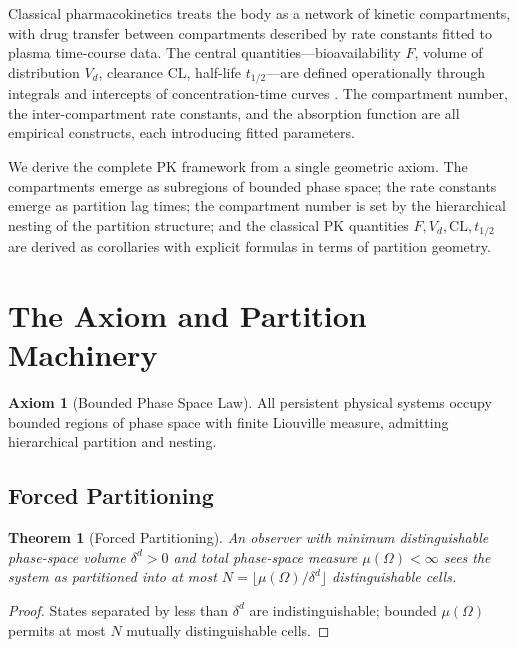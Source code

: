 \documentclass[twocolumn,10pt,a4paper]{article}
\newtheorem{theorem}{Theorem}[section]
\theoremstyle{definition}
\newtheorem{axiom}{Axiom}
\theoremstyle{remark}
\begin{document}
Classical pharmacokinetics \citep{rowland_tozer_2011,shargel_yu_2016,gibaldi_perrier_1982,goodman_gilman} treats the body as a network of kinetic compartments, with drug transfer between compartments described by rate constants fitted to plasma time-course data. The central quantities---bioavailability $F$, volume of distribution $V_d$, clearance $\mathrm{CL}$, half-life $t_{1/2}$---are defined operationally through integrals and intercepts of concentration-time curves \citep{gibaldi_perrier_1982,rowland_tozer_2011}. The compartment number, the inter-compartment rate constants, and the absorption function are all empirical constructs, each introducing fitted parameters.

We derive the complete PK framework from a single geometric axiom. The compartments emerge as subregions of bounded phase space; the rate constants emerge as partition lag times; the compartment number is set by the hierarchical nesting of the partition structure; and the classical PK quantities $F, V_d, \mathrm{CL}, t_{1/2}$ are derived as corollaries with explicit formulas in terms of partition geometry.

\section{The Axiom and Partition Machinery}

\begin{axiom}[Bounded Phase Space Law]
\label{ax:bps}
All persistent physical systems occupy bounded regions of phase space with finite Liouville measure, admitting hierarchical partition and nesting.
\end{axiom}

\subsection{Forced Partitioning}

\begin{theorem}[Forced Partitioning]
An observer with minimum distinguishable phase-space volume $\delta^d > 0$ and total phase-space measure $\mu(\Omega) < \infty$ sees the system as partitioned into at most $N = \lfloor\mu(\Omega)/\delta^d\rfloor$ distinguishable cells.
\end{theorem}

\begin{proof}
States separated by less than $\delta^d$ are indistinguishable; bounded $\mu(\Omega)$ permits at most $N$ mutually distinguishable cells.
\end{proof}
\end{document}
